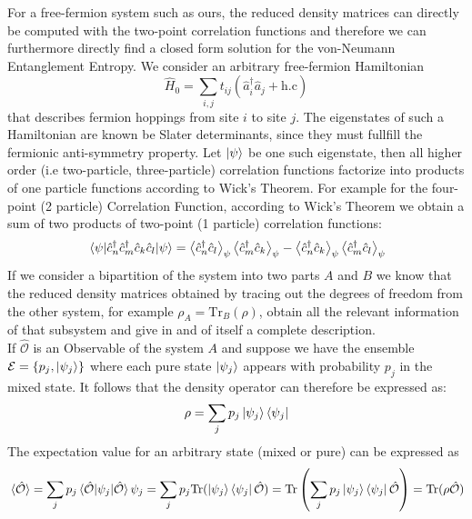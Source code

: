 \documentclass[11pt, a4paper]{article}
\theoremstyle{definition} %
\begin{document}
	For a free-fermion system such as ours, the reduced density matrices can directly be computed with the two-point correlation functions and therefore we can furthermore directly find a closed form solution for the von-Neumann Entanglement Entropy. We consider an arbitrary free-fermion Hamiltonian 
	\begin{equation}
	\hat{H}_0 = \sum_{i,j} t_{ij}( \hat{a}_i^\dagger \hat{a}_j + \text{h.c})
	\end{equation}	
	that describes fermion hoppings from site $i$ to site $j$. The eigenstates of such a Hamiltonian are known be Slater determinants, since they must fullfill the fermionic anti-symmetry property. Let $\ket{\psi}$ be one such eigenstate, then all higher order (i.e two-particle, three-particle) correlation functions factorize into products of one particle functions according to Wick's Theorem. For example for the four-point (2 particle) Correlation Function, according to Wick's Theorem we obtain a sum of two products of two-point (1 particle) correlation functions:
	\begin{equation}
		\mel{\psi}{\hat{c}_n^\dagger \hat{c}_m^\dagger \hat{c}_k \hat{c}_l}{\psi} = \expval{\hat{c}_n^\dagger \hat{c}_l}_{\psi} \expval{\hat{c}_m^\dagger \hat{c}_k}_{\psi} - \expval{\hat{c}_n^\dagger \hat{c}_k}_\psi \expval{\hat{c}_m^\dagger \hat{c}_l}_\psi
	\end{equation}
	If we consider a bipartition of the system into two parts $A$ and $B$ we know that the reduced density matrices obtained by tracing out the degrees of freedom from the other system, for example $\rho_A = \text{Tr}_B(\rho)$, obtain all the relevant information of that subsystem and give in and of itself a complete description. \\
	
	If $\hat{\mathcal{O}}$ is an Observable of the system $A$ and suppose we have the ensemble $\mathcal{E} = \{p_j , \ket{\psi_j}\}$ where each pure state $\ket{\psi_j}$ appears with probability $p_j$ in the mixed state. It follows that the density operator can therefore be expressed as:
	\begin{equation}
		\rho = \sum_j p_j \ket{\psi_j} \bra{\psi_j}
	\end{equation}
	The expectation value for an arbitrary state (mixed or pure) can be expressed as
	\begin{equation}
		\expval*{\hat{\mathcal{O}}} = \sum_j p_j \expval*{\psi_j}{\hat{\mathcal{O }}}{\psi_j} = \sum_j p_j \text{Tr}(\ket{\psi_j} \bra{\psi_j} \hat{\mathcal{O}}) =\text{Tr}\left( \sum_j p_j \ket{\psi_j}\bra{\psi_j} \hat{\mathcal{O}}\right) = \text{Tr}(\rho \hat{\mathcal{O}})
	\end{equation}
	
\end{document}
